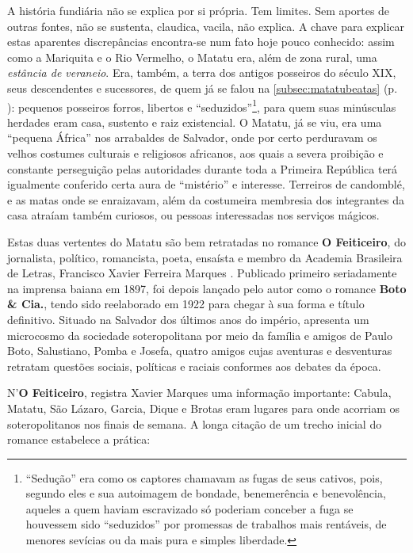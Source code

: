 A história fundiária não se explica por si própria. Tem limites. Sem aportes de outras fontes, não se sustenta, claudica, vacila, não explica. A chave para explicar estas aparentes discrepâncias encontra-se num fato hoje pouco conhecido: assim como a Mariquita e o Rio Vermelho, o Matatu era, além de zona rural, uma \textit{estância de veraneio}. Era, também, a terra dos antigos posseiros do século XIX, seus descendentes e sucessores, de quem já se falou na \autoref{subsec:matatubeatas} (p. \pageref{subsec:matatubeatas}): pequenos posseiros forros, libertos e ``seduzidos''\footnote{``Sedução'' era como os captores chamavam as fugas de seus cativos, pois, segundo eles e sua autoimagem de bondade, benemerência e benevolência, aqueles a quem haviam escravizado só poderiam conceber a fuga se houvessem sido ``seduzidos'' por promessas de trabalhos mais rentáveis, de menores sevícias ou da mais pura e simples liberdade.}, para quem suas minúsculas herdades eram casa, sustento e raiz existencial. O Matatu, já se viu, era uma ``pequena África'' nos arrabaldes de Salvador, onde por certo perduravam os velhos costumes culturais e religiosos africanos, aos quais a severa proibição e constante perseguição pelas autoridades durante toda a Primeira República terá igualmente conferido certa aura de ``mistério'' e interesse. Terreiros de candomblé, e as matas onde se enraizavam, além da costumeira membresia dos integrantes da casa atraíam também curiosos, ou pessoas interessadas nos serviços mágicos.

Estas duas vertentes do Matatu são bem retratadas no romance \textbf{O Feiticeiro}, do jornalista, político, romancista, poeta, ensaísta e membro da Academia Brasileira de Letras, Francisco Xavier Ferreira Marques \citeyear{marques_feiticeiro_1975}. Publicado primeiro seriadamente na imprensa baiana em 1897, foi depois lançado pelo autor como o romance \textbf{Boto \& Cia.}, tendo sido reelaborado em 1922 para chegar à sua forma e título definitivo. Situado na Salvador dos últimos anos do império, apresenta um microcosmo da sociedade soteropolitana por meio da família e amigos de Paulo Boto, Salustiano, Pomba e Josefa, quatro amigos cujas aventuras e desventuras retratam questões sociais, políticas e raciais conformes aos debates da época. 

N'\textbf{O Feiticeiro}, registra Xavier Marques uma informação importante: Cabula, Matatu, São Lázaro, Garcia, Dique e Brotas eram lugares para onde acorriam os soteropolitanos nos finais de semana. A longa citação de um trecho inicial do romance estabelece a prática:

